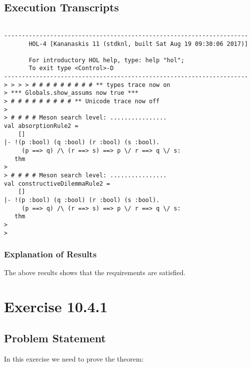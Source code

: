 \documentclass{report}
\begin{document}
\section{Execution Transcripts}
\label{sec:exec-transcr-3}

\setcounter{sessioncount}{0}
\begin{session}
  \begin{scriptsize}
\begin{verbatim}

---------------------------------------------------------------------
       HOL-4 [Kananaskis 11 (stdknl, built Sat Aug 19 09:30:06 2017)]

       For introductory HOL help, type: help "hol";
       To exit type <Control>-D
---------------------------------------------------------------------
> > > > # # # # # # # # # ** types trace now on
> *** Globals.show_assums now true ***
> # # # # # # # # # ** Unicode trace now off
> 
> # # # # Meson search level: ................
val absorptionRule2 =
    []
|- !(p :bool) (q :bool) (r :bool) (s :bool).
     (p ==> q) /\ (r ==> s) ==> p \/ r ==> q \/ s:
   thm
> 
> # # # # Meson search level: ................
val constructiveDilemmaRule2 =
    []
|- !(p :bool) (q :bool) (r :bool) (s :bool).
     (p ==> q) /\ (r ==> s) ==> p \/ r ==> q \/ s:
   thm
> 
> 
\end{verbatim}
  \end{scriptsize}
\end{session}

\subsection{Explanation of Results}
\label{sec:explanation-results-3}
The above results shows that the requirements are satisfied.




 \chapter{Exercise 10.4.1}
 \label{cha:exercise-10.4.1}
  
 \section{Problem Statement}
 \label{sec:problem-statement-4}

In this exercise we need to prove the theorem:
\HOLTokenTurnstile{}  
\end{document}
